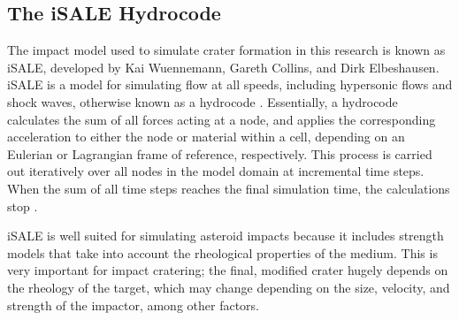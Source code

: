 \subsection{The iSALE Hydrocode}

The impact model used to simulate crater formation in this research is known as iSALE, developed by Kai Wuennemann, Gareth Collins, and Dirk Elbeshausen. iSALE is a model for simulating flow at all speeds, including hypersonic flows and shock waves, otherwise known as a hydrocode \citep{collins2002numerical}. Essentially, a hydrocode calculates the sum of all forces acting at a node, and applies the corresponding acceleration to either the node or material within a cell, depending on an Eulerian or Lagrangian frame of reference, respectively. This process is carried out iteratively over all nodes in the model domain at incremental time steps. When the sum of all time steps reaches the final simulation time, the calculations stop \citep{collins2002numerical}.

iSALE is well suited for simulating asteroid impacts because it includes strength models that take into account the rheological properties of the medium. This is very important for impact cratering; the final, modified crater hugely depends on the rheology of the target, which may change depending on the size, velocity, and strength of the impactor, among other factors.
